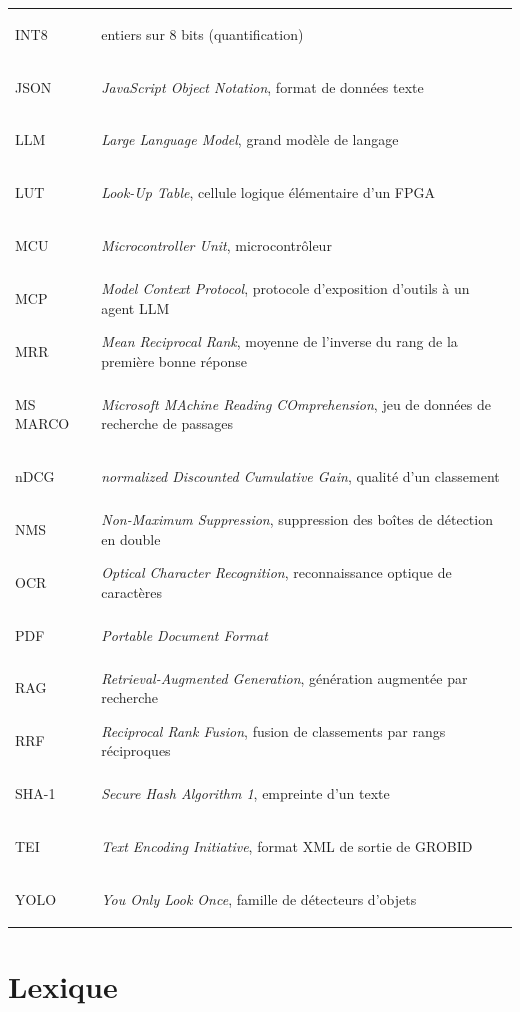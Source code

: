 \documentclass[11pt,a4paper]{article}
\begin{document}
\begin{center}
\begin{tabularx}{\linewidth}{@{}lL@{}}
\hypertarget{gl:INT8}{INT8} & entiers sur 8 bits (quantification) \\
\hypertarget{gl:JSON}{JSON} & \emph{JavaScript Object Notation}, format de données texte \\
\hypertarget{gl:LLM}{LLM} & \emph{Large Language Model}, grand modèle de langage \\
\hypertarget{gl:LUT}{LUT} & \emph{Look-Up Table}, cellule logique élémentaire d'un FPGA \\
\hypertarget{gl:MCU}{MCU} & \emph{Microcontroller Unit}, microcontrôleur \\
\hypertarget{gl:MCP}{MCP} & \emph{Model Context Protocol}, protocole d'exposition d'outils à un agent LLM \\
\hypertarget{gl:MRR}{MRR} & \emph{Mean Reciprocal Rank}, moyenne de l'inverse du rang de la première bonne réponse \\
\hypertarget{gl:MSMARCO}{MS MARCO} & \emph{Microsoft MAchine Reading COmprehension}, jeu de données de recherche de passages \\
\hypertarget{gl:nDCG}{nDCG} & \emph{normalized Discounted Cumulative Gain}, qualité d'un classement \\
\hypertarget{gl:NMS}{NMS} & \emph{Non-Maximum Suppression}, suppression des boîtes de détection en double \\
\hypertarget{gl:OCR}{OCR} & \emph{Optical Character Recognition}, reconnaissance optique de caractères \\
\hypertarget{gl:PDF}{PDF} & \emph{Portable Document Format} \\
\hypertarget{gl:RAG}{RAG} & \emph{Retrieval-Augmented Generation}, génération augmentée par recherche \\
\hypertarget{gl:RRF}{RRF} & \emph{Reciprocal Rank Fusion}, fusion de classements par rangs réciproques \\
\hypertarget{gl:SHA}{SHA-1} & \emph{Secure Hash Algorithm 1}, empreinte d'un texte \\
\hypertarget{gl:TEI}{TEI} & \emph{Text Encoding Initiative}, format XML de sortie de GROBID \\
\hypertarget{gl:YOLO}{YOLO} & \emph{You Only Look Once}, famille de détecteurs d'objets \\
\bottomrule
\end{tabularx}
\end{center}

\section{Lexique}
\label{sec:lexique}
\end{document}
